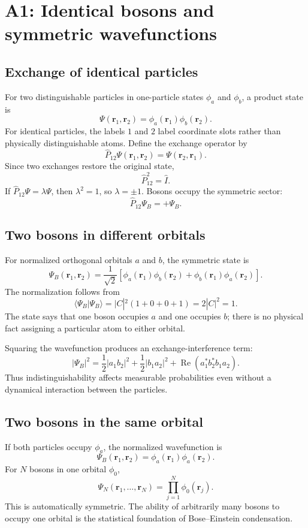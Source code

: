 \section{A1: Identical bosons and symmetric wavefunctions}

\subsection{Exchange of identical particles}

For two distinguishable particles in one-particle states
$\phi_a$ and $\phi_b$, a product state is
\[
\Psi(\mathbf r_1,\mathbf r_2)
=\phi_a(\mathbf r_1)\phi_b(\mathbf r_2).
\]
For identical particles, the labels $1$ and $2$ label coordinate slots rather
than physically distinguishable atoms. Define the exchange operator by
\[
\hat P_{12}\Psi(\mathbf r_1,\mathbf r_2)
=\Psi(\mathbf r_2,\mathbf r_1).
\]
Since two exchanges restore the original state,
\[
\hat P_{12}^2=\hat I.
\]
If $\hat P_{12}\Psi=\lambda\Psi$, then
$\lambda^2=1$, so $\lambda=\pm1$. Bosons occupy the symmetric sector:
\[
\boxed{\hat P_{12}\Psi_B=+\Psi_B.}
\]

\subsection{Two bosons in different orbitals}

For normalized orthogonal orbitals $a$ and $b$, the symmetric state is
\[
\boxed{
\Psi_B(\mathbf r_1,\mathbf r_2)
=\frac{1}{\sqrt2}
\left[
\phi_a(\mathbf r_1)\phi_b(\mathbf r_2)
+\phi_b(\mathbf r_1)\phi_a(\mathbf r_2)
\right].
}
\]
The normalization follows from
\[
\langle\Psi_B|\Psi_B\rangle
=|C|^2(1+0+0+1)=2|C|^2=1.
\]
The state says that one boson occupies $a$ and one occupies $b$; there is no
physical fact assigning a particular atom to either orbital.

Squaring the wavefunction produces an exchange-interference term:
\[
|\Psi_B|^2
=\frac12|a_1b_2|^2+\frac12|b_1a_2|^2
+\operatorname{Re}(a_1^*b_2^*b_1a_2).
\]
Thus indistinguishability affects measurable probabilities even without a
dynamical interaction between the particles.

\subsection{Two bosons in the same orbital}

If both particles occupy $\phi_a$, the normalized wavefunction is
\[
\boxed{
\Psi_B(\mathbf r_1,\mathbf r_2)
=\phi_a(\mathbf r_1)\phi_a(\mathbf r_2).
}
\]
For $N$ bosons in one orbital $\phi_0$,
\[
\boxed{
\Psi_N(\mathbf r_1,\ldots,\mathbf r_N)
=\prod_{j=1}^{N}\phi_0(\mathbf r_j).
}
\]
This is automatically symmetric. The ability of arbitrarily many bosons to
occupy one orbital is the statistical foundation of Bose--Einstein
condensation.

